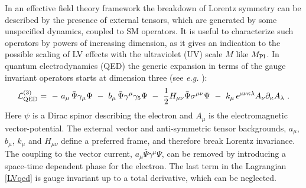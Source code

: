 \documentclass[12pt]{revtex4}
\begin{document}
In an effective field theory framework the breakdown of Lorentz 
symmetry can be described by the presence of external tensors, which
are generated by some unspecified dynamics, coupled to SM operators. 
It is useful to characterize such operators by powers of increasing
dimension, as it gives an indication to the possible scaling of LV
effects with the ultraviolet (UV) scale $M$ like $M_{\rm Pl}$. In
quantum electrodynamics (QED) the generic expansion in terms of the
gauge invariant operators starts at dimension three (see {\em e.g.} 
\cite{Kost1}): 
%
\begin{equation}
{\cal L}_{\rm QED}^{(3)} =
~-~a_\mu\,  \bar \Psi \gamma_\mu \Psi
~-~ b_\mu\,  \bar \Psi \gamma^\mu \gamma_5 \Psi 
~-~ \frac{1}{2}H_{\mu\nu}\bar \Psi \sigma^{\mu\nu} \Psi
~-~ k_\mu\,  
\epsilon^{\mu\nu\kappa\lambda} A_\nu \partial_\kappa A_\lambda~.
\label{LVqed}
\end{equation}
%
Here $\psi$ is a Dirac spinor describing the electron and $A_\mu$ is the
electromagnetic vector-potential. The external vector and
anti-symmetric tensor backgrounds, $a_{\mu}$, $b_\mu$, $k_\mu$ and
$H_{\mu\nu}$ define a preferred frame, and therefore break Lorentz
invariance. The coupling to the vector current, 
$a_\mu \bar \Psi \gamma^\mu \Psi$, can be removed by introducing a
space-time dependent phase for the electron. The last term in the
Lagrangian \eqref{LVqed} is gauge invariant up to a total derivative,
which can be neglected. 
\end{document}
